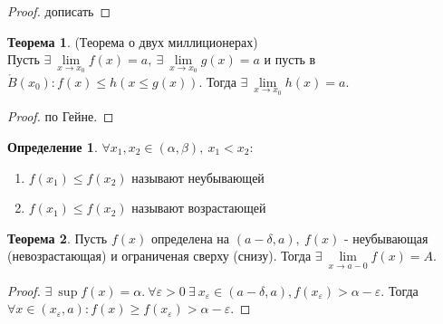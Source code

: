 \documentclass[a4paper, 12pt]{article}
\newcommand{\Bo}{\mathring{B}}
\renewcommand{\epsilon}{\varepsilon}
\theoremstyle{definition}
\newtheorem*{definition}{Определение}
\newtheorem*{theorem}{Теорема}
\begin{document}
        \begin{proof}
            дописать
        \end{proof} 
        \begin{theorem}(Теорема о двух миллиционерах)\\
            Пусть $\exists\ \lim\limits_{x\to x_0}f(x)=a,\ \exists\ \lim\limits_{x\to x_0}g(x)=a$ и пусть в $\Bo(x_0): f(x)\leq h(x\leq g(x))$. Тогда $\exists\ \lim\limits_{x\to x_0}h(x)=a$.
        \end{theorem} 
        \begin{proof}
            по Гейне.
        \end{proof} 
        \begin{definition}
            $\forall x_1, x_2\in (\alpha, \beta),\ x_1<x_2$:
            \begin{enumerate}
                \item $f(x_1)\leq f(x_2)$ называют неубывающей
                \item $f(x_1)\leq f(x_2)$ называют возрастающей
            \end{enumerate}
        \end{definition} 
        \begin{theorem}
            Пусть $f(x)$ определена на $(a-\delta, a),\ f(x)$ - неубывающая (невозрастающая) и ограниченая сверху (снизу). Тогда $\exists\ \lim\limits_{x\to a-0}f(x)=A$.
        \end{theorem} 
        \begin{proof}
            $\exists\ \sup{f(x)}=\alpha.\ \forall \epsilon>0\ \exists\ x_{\epsilon}\in (a-\delta, a), f(x_{\epsilon})>\alpha-\epsilon$. Тогда $\forall x\in (x_{\epsilon},a): f(x)\geq f(x_{\epsilon})>\alpha-\epsilon$.
        \end{proof}
\end{document}
